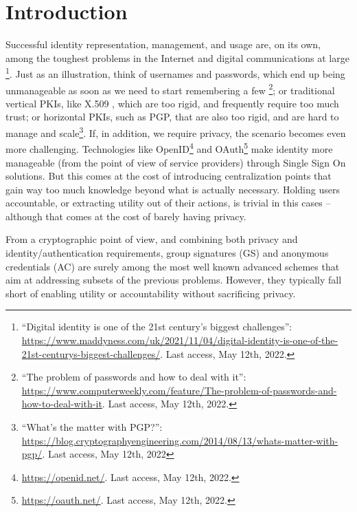 \section{Introduction}
\label{sec:introduction}

Successful identity representation, management, and usage are, on its own, among
the toughest problems in the Internet and digital communications at large%
\footnote{``Digital identity is one of the 21st century's biggest challenges'':
  \href{https://www.maddyness.com/uk/2021/11/04/digital-identity-is-one-of-the-21st-centurys-biggest-challenges/}{https://www.maddyness.com/uk/2021/11/04/digital-identity-is-one-of-the-21st-centurys-biggest-challenges/}. Last access, May 12th, 2022.}.
Just as an illustration, think
of usernames and passwords, which end up being unmanageable as soon as we need
to start remembering a few%
\footnote{``The problem of passwords and how to deal with it'': \url{https://www.computerweekly.com/feature/The-problem-of-passwords-and-how-to-deal-with-it}. Last access,
May 12th, 2022.}; or traditional vertical PKIs, like X.509 \cite{rfc5280},
which are too rigid, and frequently require too much trust; or
horizontal PKIs, such as PGP, that are also too rigid, and are hard to manage
and scale\footnote{``What's the matter with PGP?'': \url{https://blog.cryptographyengineering.com/2014/08/13/whats-matter-with-pgp/}. Last access, May 12th, 2022}.
If, in addition, we require privacy, the scenario becomes even more
challenging. Technologies like OpenID\footnote{\url{https://openid.net/}. Last
  access, May 12th, 2022.} and OAuth\footnote{\url{https://oauth.net/}. Last
  access, May 12th, 2022.} make identity more
manageable (from the point of view of service providers) through Single Sign
On solutions. But this comes at the cost of introducing centralization points
that gain way too much knowledge beyond what is actually necessary. Holding
users accountable, or extracting utility out of their actions, is trivial in
this cases -- although that comes at the cost of barely having privacy.


From a cryptographic point of view, and combining both privacy and
identity/authentication requirements, group signatures (GS) and anonymous
credentials (AC) are surely among the most well known advanced schemes that
aim at addressing subsets of the previous problems. However, they typically fall
short of enabling utility or accountability without sacrificing privacy.

